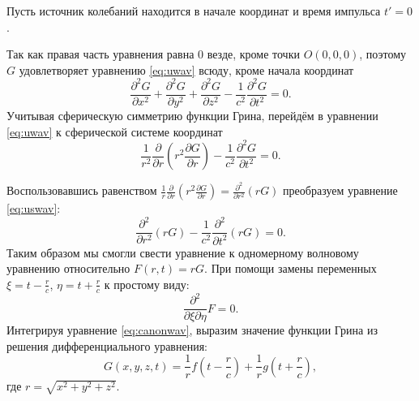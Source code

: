 \documentclass[a4paper, fontsize=14pt]{article}
\begin{document}
	Пусть источник колебаний находится в начале координат и время импульса $t' = 0$. 
	
	Так как правая часть уравнения равна 0 везде, кроме точки $O(0,0,0)$, поэтому 
	$G$ удовлетворяет уравнению \eqref{eq:uwav} всюду, кроме начала координат
	\begin{equation}
		\frac{\partial^2 G}{\partial x^2} + \frac{\partial^2 G}{\partial y^2} +
		\frac{\partial^2 G}{\partial z^2} - \frac{1}{c^2} \frac{\partial^2 G}{\partial
			t^2} = 0.
		\label{eq:uwav}
	\end{equation}
	Учитывая сферическую симметрию функции Грина, перейдём в уравнении \eqref{eq:uwav} к сферической системе координат
	\begin{equation}
		\frac{1}{r^2}\frac{\partial}{\partial r}\left( r^2 \frac{\partial G}{\partial r} \right)- \frac{1}{c^2} \frac{\partial^2 G}{\partial
			t^2} = 0.
		\label{eq:uswav}
	\end{equation}

	Воспользовавшись равенством $\frac{1}{r}\frac{\partial}{\partial r}\left(r^2\frac{\partial G}{\partial r}\right) = \frac{\partial^2}{\partial r^2}\left(rG\right)$ преобразуем уравнение \eqref{eq:uswav}:
	\begin{equation}
		\frac{\partial^2}{\partial r^2}\left( r  G\right)- \frac{1}{c^2} \frac{\partial^2 }{\partial
			t^2}\left(r G\right) = 0.
		\label{eq:uswav2}
	\end{equation}
	Таким образом мы смогли свести уравнение к одномерному волновому уравнению относительно $F(r,t) = rG$. При помощи замены переменных $\xi = t - \frac{r}{c}$, $\eta = t+\frac{r}{c}$ к простому виду:
	\begin{equation}
		\frac{\partial^2}{\partial \xi \partial \eta} F = 0.
		\label{eq:canonwav}
	\end{equation}
	Интегрируя уравнение \eqref{eq:canonwav}, выразим значение функции Грина из решения дифференциального уравнения:
	\begin{equation}
		G(x,y,z,t) = \frac{1}{r}f\left(t-\frac{r}{c}\right) + \frac{1}{r} g\left(t+\frac{r}{c}\right),
		\label{eq:canonsol}
	\end{equation}
где $r = \sqrt{x^2+y^2+z^2}$.
\end{document}
